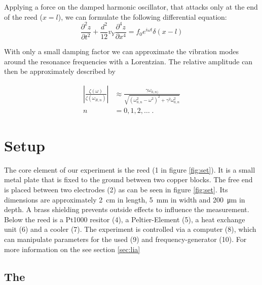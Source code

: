 \documentclass[twoside, a4paper, DIV=11,twocolumn, 12pt]{book}
\begin{document}
Applying a force on the damped harmonic oscillator, that attacks only at the end of the reed ($x = l$), we can formulate the following differential equation:
\begin{equation}
 \frac{\partial^2z}{\partial t^2} + \frac{d^2}{12} v_Y \frac{\partial^4z}{\partial x^4} = f_0 e^{i\omega t}\delta(x - l)
\end{equation}

With only a small damping factor we can approximate the vibration modes around the resonance frequencies with a Lorentzian.
The relative amplitude can then be approximately described by 

\begin{align}
 \left| \frac{\zeta(\omega)}{\zeta(\omega_{R,n})} \right| &\approx \frac{\gamma \omega_{0,n)}}{\sqrt{(\omega_{0,n}^2 - \omega^2)^2 + \gamma^2\omega_{0,n}^2}} \\
 n &= 0, 1, 2,\dots \; \text{.}
\end{align}






\chapter{Setup}
\label{sec:set}


The core element of our experiment is the reed (1 in figure \ref{fig:set}).  It is a small metal plate that is fixed to the ground between two copper blocks.
The free end is placed between two electrodes (2) as can be seen in figure \ref{fig:set}. Its dimensions are approximately 
\SI{2}{\centi\meter} in length, \SI{5}{\milli\meter} in width and \SI{200}{\micro\meter} in depth. A brass shielding prevents outside effects to influence the measurement.
Below the reed is a Pt1000 resitor (4), a Peltier-Element (5), a heat exchange unit (6) and a cooler (7). 
The experiment is controlled via a computer (8), which can manipulate parameters for the used \LIA (9) and frequency-generator (10). 
For more information on the \LIA see section \ref{sec:lia}



\section{The \LIA}
\label{sec.lia}
\end{document}
